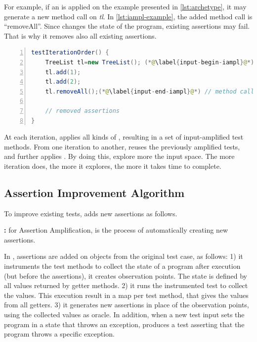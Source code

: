For example, if an \Iampl is applied on the example presented in \autoref{lst:archetype}, it may generate a new method call on \emph{tl}.
In \autoref{lst:iampl-example}, the added method call is ``removeAll''.
Since \dspot changes the state of the program, existing assertions may fail. 
That is why it removes also all existing assertions.

\begin{lstlisting}[caption={An example of an \Iampl{}: the amplification added a method call to \emph{removeAll()} on \emph{tl}.},label=lst:iampl-example,float,language=java,numbers=left] 
testIterationOrder() {
	TreeList tl=new TreeList(); (*@\label{input-begin-iampl}@*)
	tl.add(1);
	tl.add(2);
	tl.removeAll();(*@\label{input-end-iampl}@*) // method call added
	
	// removed assertions
}
\end{lstlisting}

At each iteration, \dspot applies all kinds of \Iampl, resulting in a set of input-amplified test methods. 
From one iteration to another, \dspot reuses the previously amplified tests, and further applies \Iampl.
By doing this, \dspot explore more the input space.
The more iteration \dspot does, the more it explores, the more it takes time to complete.

\subsection{Assertion Improvement Algorithm}
\label{subsec:dspot:algorithm:new-assertions}

To improve existing tests, \dspot adds new assertions as follows.

\textbf{\Aampl:} for Assertion Amplification, is the process of automatically creating new assertions.

In \dspot, assertions are added on objects from the original test case, as follows: 
1) it instruments the test methods to collect the state of a program after execution (but before the assertions), \ie it creates observation points. 
The state is defined by all values returned by getter methods.
2) it runs the instrumented test to collect the values.
This execution result in a map per test method, that gives the values from all getters.
3) it generates new assertions in place of the observation points, using the collected values as oracle. 
In addition, when a new test input sets the program in a state that throws an exception, \dspot produces a test asserting that the program throws a specific exception.


